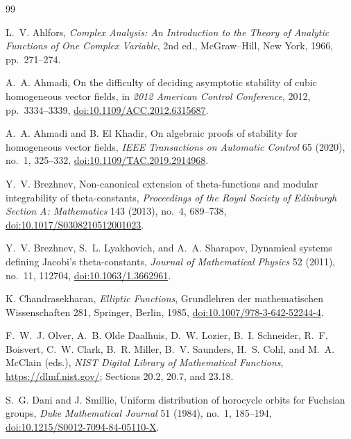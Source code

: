 \documentclass[11pt]{article}
\begin{document}
\begin{thebibliography}{99}
\small

L.~V. Ahlfors,
\newblock \emph{Complex Analysis: An Introduction to the Theory of Analytic
Functions of One Complex Variable}, 2nd ed.,
\newblock McGraw--Hill, New York, 1966, pp.~271--274.

A.~A. Ahmadi,
\newblock On the difficulty of deciding asymptotic stability of cubic
homogeneous vector fields,
\newblock in \emph{2012 American Control Conference}, 2012,
pp.~3334--3339,
\newblock \href{https://doi.org/10.1109/ACC.2012.6315687}
{doi:10.1109/ACC.2012.6315687}.

A.~A. Ahmadi and B. El Khadir,
\newblock On algebraic proofs of stability for homogeneous vector fields,
\newblock \emph{IEEE Transactions on Automatic Control} 65 (2020), no.~1,
325--332,
\newblock \href{https://doi.org/10.1109/TAC.2019.2914968}
{doi:10.1109/TAC.2019.2914968}.

Y.~V. Brezhnev,
\newblock Non-canonical extension of theta-functions and modular
integrability of theta-constants,
\newblock \emph{Proceedings of the Royal Society of Edinburgh Section A:
Mathematics} 143 (2013), no.~4, 689--738,
\newblock \href{https://doi.org/10.1017/S0308210512001023}
{doi:10.1017/S0308210512001023}.

Y.~V. Brezhnev, S.~L. Lyakhovich, and A.~A. Sharapov,
\newblock Dynamical systems defining Jacobi's theta-constants,
\newblock \emph{Journal of Mathematical Physics} 52 (2011), no.~11,
112704,
\newblock \href{https://doi.org/10.1063/1.3662961}
{doi:10.1063/1.3662961}.

K. Chandrasekharan,
\newblock \emph{Elliptic Functions},
\newblock Grundlehren der mathematischen Wissenschaften 281,
Springer, Berlin, 1985,
\newblock \href{https://doi.org/10.1007/978-3-642-52244-4}
{doi:10.1007/978-3-642-52244-4}.

F.~W.~J. Olver, A.~B. Olde Daalhuis, D.~W. Lozier, B.~I. Schneider,
R.~F. Boisvert, C.~W. Clark, B.~R. Miller, B.~V. Saunders, H.~S. Cohl,
and M.~A. McClain (eds.),
\newblock \emph{NIST Digital Library of Mathematical Functions},
\newblock \url{https://dlmf.nist.gov/}; Sections 20.2, 20.7, and 23.18.

S.~G. Dani and J. Smillie,
\newblock Uniform distribution of horocycle orbits for Fuchsian groups,
\newblock \emph{Duke Mathematical Journal} 51 (1984), no.~1, 185--194,
\newblock \href{https://doi.org/10.1215/S0012-7094-84-05110-X}
{doi:10.1215/S0012-7094-84-05110-X}.


\end{thebibliography}
\end{document}
